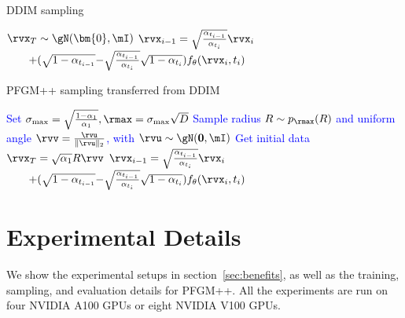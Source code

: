 \begin{minipage}{0.46\textwidth}
\vspace{-44pt}
\begin{algorithm}[H]
    \centering
    \caption{DDIM sampling}\label{algorithm-ddpm-sample}
    \begin{algorithmic}[1]
\STATE $\rvx_T \sim \gN(\bm{0}, \mI)$
\STATE $\rvx_{i-1} =\sqrt{\frac{\alpha_{t_{i-1}}}{\alpha_{t_i}}}\rvx_i $\\
$ \qquad +(\sqrt{1-\alpha_{t_{i-1}}}{-}\sqrt{\frac{\alpha_{t_{i-1}}}{\alpha_{t_i}}}\sqrt{1-\alpha_{t_i}})f_{\theta}(\rvx_i, t_i)$
\ENDFOR
    \end{algorithmic}
\end{algorithm}
\end{minipage}
\hfill
\begin{minipage}{0.50\textwidth}
\begin{algorithm}[H]
    \centering
    \caption{PFGM++ sampling transferred from DDIM}\label{algorithm-ddpm-pfgmpp-sample}
    \begin{algorithmic}[1]
     \STATE \textcolor{blue}{Set $\sigma_{\textrm{max}}=\sqrt{\frac{1-\alpha_{1}}{\alpha_{1}}}, \rmax = \sigma_{\textrm{max}}\sqrt{D}$}
        \STATE  \textcolor{blue}{Sample radius $R \sim p_{\rmax}(R)$
       and  uniform angle $\rvv =\frac{\rvu}{\|\rvu\|_2}$, with $\rvu \sim \gN(\bf{0}, \mI)$}
        \STATE \textcolor{blue}{Get initial data $\rvx_T = \sqrt{\alpha_1}R\rvv$}
\STATE $\rvx_{i-1} =\sqrt{\frac{\alpha_{t_{i-1}}}{\alpha_{t_i}}}\rvx_i $\\
$ \qquad +(\sqrt{1-\alpha_{t_{i-1}}}{-}\sqrt{\frac{\alpha_{t_{i-1}}}{\alpha_{t_i}}}\sqrt{1-\alpha_{t_i}})f_{\theta}(\rvx_i, t_i)$
\ENDFOR
    \end{algorithmic}
\end{algorithm}
\end{minipage}






\section{Experimental Details}
\label{app:exp}
We show the experimental setups in section~\ref{sec:benefits}, as well as the training, sampling, and evaluation details for PFGM++. All the experiments are run on four NVIDIA A100 GPUs or eight NVIDIA V100 GPUs.


